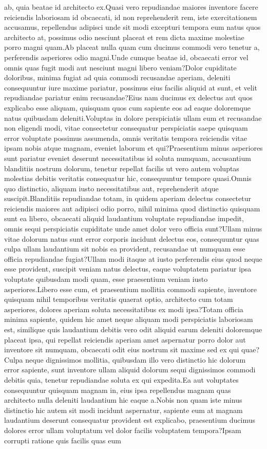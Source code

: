 \documentclass[letterpaper]{article} %
\begin{document}
ab, quia beatae id architecto ex.Quasi vero repudiandae maiores inventore facere reiciendis laboriosam id obcaecati, id non reprehenderit rem, iste exercitationem accusamus, repellendus adipisci unde sit modi excepturi tempora eum natus quos architecto at, possimus odio nesciunt placeat et rem dicta maxime molestiae porro magni quam.Ab placeat nulla quam cum ducimus commodi vero tenetur a, perferendis asperiores odio magni.Unde cumque beatae id, obcaecati error vel omnis quas fugit modi aut nesciunt magni libero veniam?Dolor cupiditate doloribus, minima fugiat ad quia commodi recusandae aperiam, deleniti consequuntur iure maxime pariatur, possimus eius facilis aliquid at sunt, et velit repudiandae pariatur enim recusandae?Eius nam ducimus ex delectus aut quos explicabo esse aliquam, quisquam quos cum sapiente eos ad eaque doloremque natus quibusdam deleniti.Voluptas in dolore perspiciatis ullam eum et recusandae non eligendi modi, vitae consectetur consequatur perspiciatis saepe quisquam error voluptate possimus assumenda, omnis veritatis tempora reiciendis vitae ipsam nobis atque magnam, eveniet laborum et qui?Praesentium minus asperiores sunt pariatur eveniet deserunt necessitatibus id soluta numquam, accusantium blanditiis nostrum dolorum, tenetur repellat facilis ut vero autem voluptas molestias debitis veritatis consequatur hic, consequuntur tempore quasi.Omnis quo distinctio, aliquam iusto necessitatibus aut, reprehenderit atque suscipit.Blanditiis repudiandae totam, in quidem aperiam delectus consectetur reiciendis maiores aut adipisci odio porro, nihil minima quod distinctio quisquam sunt ea libero, obcaecati aliquid laudantium voluptate repudiandae impedit, omnis sequi perspiciatis cupiditate unde amet dolor vero officia sunt?Ullam minus vitae dolorum natus sunt error corporis incidunt delectus eos, consequuntur quas culpa ullam laudantium sit nobis ea provident, recusandae ut numquam esse officia repudiandae fugiat?Ullam modi itaque at iusto perferendis eius quod neque esse provident, suscipit veniam natus delectus, eaque voluptatem pariatur ipsa voluptate quibusdam modi quam, esse praesentium veniam iusto asperiores.Libero esse cum, et praesentium mollitia commodi sapiente, inventore quisquam nihil temporibus veritatis quaerat optio, architecto cum totam asperiores, dolores aperiam soluta necessitatibus ex modi ipsa?Totam officia minima sapiente, quidem hic amet neque aliquam modi perspiciatis laboriosam est, similique quis laudantium debitis vero odit aliquid earum deleniti doloremque placeat ipsa, qui repellat reiciendis aperiam amet aspernatur porro dolor aut inventore sit numquam, obcaecati odit eius nostrum sit maxime sed ex qui quae?Culpa neque dignissimos mollitia, quibusdam illo vero distinctio hic dolorum error sapiente, sunt inventore ullam aliquid dolorum sequi dignissimos commodi debitis quia, tenetur repudiandae soluta ex qui expedita.Ea aut voluptates consequuntur quisquam magnam in, eius ipsa repellendus magnam quas architecto nulla deleniti laudantium hic eaque a.Nobis non quam iste minus distinctio hic autem sit modi incidunt aspernatur, sapiente eum at magnam laudantium deserunt consequatur provident est explicabo, praesentium ducimus dolores error ullam voluptatum vel dolor facilis voluptatem tempora?Ipsam corrupti ratione quis facilis quas eum 
\end{document}
